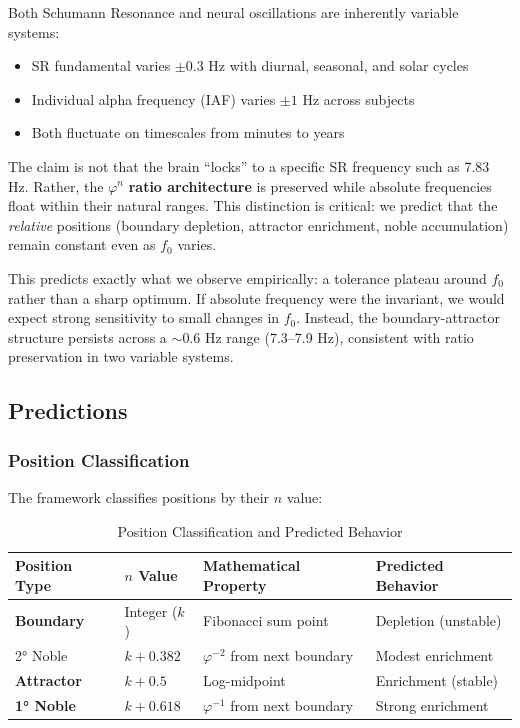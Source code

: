 \documentclass[11pt,a4paper]{article}
\newcommand{\phisym}{\varphi}
\newcommand{\fzero}{f_0}
\begin{document}
\begin{keyinsight}
Both Schumann Resonance and neural oscillations are inherently variable systems:

\begin{itemize}
    \item SR fundamental varies $\pm 0.3$ Hz with diurnal, seasonal, and solar cycles
    \item Individual alpha frequency (IAF) varies $\pm 1$ Hz across subjects
    \item Both fluctuate on timescales from minutes to years
\end{itemize}

The claim is not that the brain ``locks'' to a specific SR frequency such as 7.83 Hz. Rather, the $\phisym^n$ \textbf{ratio architecture} is preserved while absolute frequencies float within their natural ranges. This distinction is critical: we predict that the \textit{relative} positions (boundary depletion, attractor enrichment, noble accumulation) remain constant even as $\fzero$ varies.

This predicts exactly what we observe empirically: a tolerance plateau around $\fzero$ rather than a sharp optimum. If absolute frequency were the invariant, we would expect strong sensitivity to small changes in $\fzero$. Instead, the boundary-attractor structure persists across a $\sim$0.6 Hz range (7.3--7.9 Hz), consistent with ratio preservation in two variable systems.
\end{keyinsight}

\subsection{Predictions}

\subsubsection{Position Classification}

The framework classifies positions by their $n$ value:

\begin{table}[H]
\centering
\caption{Position Classification and Predicted Behavior}
\label{tab:position_classification}
\begin{tabular}{@{}llll@{}}
\toprule
Position Type & $n$ Value & Mathematical Property & Predicted Behavior \\
\midrule
\textbf{Boundary} & Integer ($k$) & Fibonacci sum point & Depletion (unstable) \\
2° Noble & $k + 0.382$ & $\phisym^{-2}$ from next boundary & Modest enrichment \\
\textbf{Attractor} & $k + 0.5$ & Log-midpoint & Enrichment (stable) \\
\textbf{1° Noble} & $k + 0.618$ & $\phisym^{-1}$ from next boundary & Strong enrichment \\
\bottomrule
\end{tabular}
\end{table}
\end{document}
